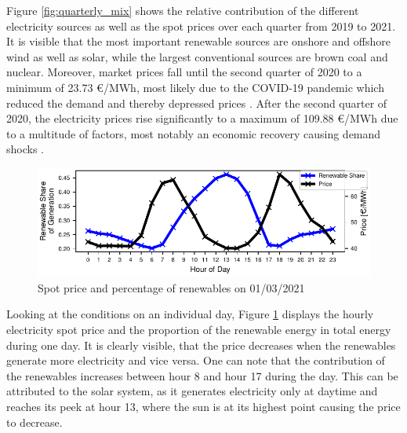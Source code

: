 \documentclass{article}
\begin{document}
Figure \ref{fig:quarterly_mix} shows the relative contribution of the different electricity sources as well as the spot prices over each quarter from 2019 to 2021.
It is visible that the most important renewable sources are onshore and offshore wind as well as solar, while the largest conventional sources are brown coal and nuclear.
Moreover, market prices fall until the second quarter of 2020 to a minimum of 23.73 €/MWh, most likely due to the COVID-19 pandemic which reduced the demand and thereby depressed prices \citep{covid_electricity_systems}.
After the second quarter of 2020, the electricity prices rise significantly to a maximum of 109.88 €/MWh due to a multitude of factors, most notably an economic recovery causing demand shocks \citep{long_covid_energy_prices}.




\begin{figure}[h]
    \centering
    \includegraphics[width=0.7\columnwidth]{doc/fig/example_day.pdf}
    \caption{Spot price and percentage of renewables on 01/03/2021}
    \label{fig:example_day}
\end{figure}

Looking at the conditions on an individual day, Figure \ref{fig:example_day} displays the hourly electricity spot price and the proportion of the renewable energy in total energy during one day. 
It is clearly visible, that the price decreases when the renewables generate more electricity and vice versa. 
One can note that the contribution of the renewables increases between hour 8 and hour 17 during the day. 
This can be attributed to the solar system, as it generates electricity only at daytime and reaches its peek at hour 13, where the sun is at its highest point causing the price to decrease. 
\end{document}
